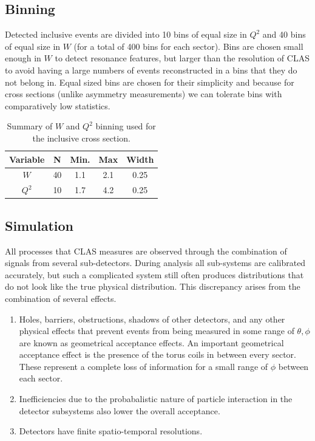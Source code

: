 \subsection{Binning}
Detected inclusive events are divided into 10 bins of equal size in $Q^2$ and 40 bins of equal size in $W$ (for a total of 400 bins for each sector).  Bins are chosen small enough in $W$ to detect resonance features, but larger than the resolution of CLAS to avoid having a large numbers of events reconstructed in a bins that they do not belong in.  Equal sized bins are chosen for their simplicity and because for cross sections (unlike asymmetry measurements) we can tolerate bins with comparatively low statistics. 

\begin{table}
  \centering
  \begin{tabular}{c|c|c|c|c}
    Variable & N & Min. & Max & Width \\
    \hline 
    $W$   & 40 & 1.1 & 2.1 & 0.25 \\
    $Q^2$ & 10 & 1.7 & 4.2 & 0.25
  \end{tabular}
  \caption{Summary of $W$ and $Q^2$ binning used for the inclusive cross section.}
\end{table}

\subsection{Simulation}
All processes that CLAS measures are observed through the combination of signals from several sub-detectors.  During analysis all sub-systems are calibrated accurately, but such a complicated system still often produces distributions that do not look like the true physical distribution.  This discrepancy arises from the combination of several effects.

\begin{enumerate}
	\item Holes, barriers, obstructions, shadows of other detectors, and any other physical effects that prevent events from being measured in some range of $\theta, \phi$ are known as geometrical acceptance effects.  An important geometrical acceptance effect is the presence of the torus coils in between every sector.  These represent a complete loss of information for a small range of $\phi$ between each sector.
	\item Inefficiencies due to the probabalistic nature of particle interaction in the detector subsystems also lower the overall acceptance.  
	\item Detectors have finite spatio-temporal resolutions.  
\end{enumerate}

